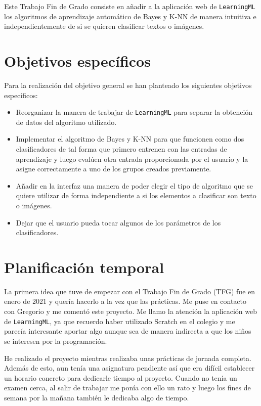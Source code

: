 \documentclass[a4paper, 12pt]{book}
\begin{document}
Este Trabajo Fin de Grado consiste en añadir a la aplicación web de \texttt{LearningML} los algoritmos de aprendizaje automático de Bayes y K-NN de manera intuitiva e independientemente de si se quieren clasificar textos o imágenes.

\section{Objetivos específicos}
\label{sec:objetivos-especificos}

Para la realización del objetivo general se han planteado los siguientes objetivos específicos:
\begin{itemize}
 
	\item Reorganizar la manera de trabajar de \texttt{LearningML} para separar la obtención de datos del algoritmo utilizado.
 
	\item Implementar el algoritmo de Bayes y K-NN para que funcionen como dos clasificadores de tal forma que primero entrenen con las entradas de aprendizaje y luego evalúen otra entrada proporcionada por el usuario y la asigne correctamente a uno de los grupos creados previamente.
 
	\item Añadir en la interfaz una manera de poder elegir el tipo de algoritmo que se quiere utilizar de forma independiente a si los elementos a clasificar son texto o imágenes.

	\item Dejar que el usuario pueda tocar algunos de los parámetros de los clasificadores.

\end{itemize}


\section{Planificación temporal}
\label{sec:planificacion-temporal}

La primera idea que tuve de empezar con el Trabajo Fin de Grado (TFG) fue en enero de 2021 y quería hacerlo a la vez que las prácticas. Me puse en contacto con Gregorio y me comentó este proyecto. Me llamo la atención la aplicación web de \texttt{LearningML}, ya que recuerdo haber utilizado Scratch en el colegio y me parecía interesante aportar algo aunque sea de manera indirecta a que los niños se interesen por la programación.

He realizado el proyecto mientras realizaba unas prácticas de jornada completa. Además de esto, aun tenía una asignatura pendiente así que era difícil establecer un horario concreto para dedicarle tiempo al proyecto. Cuando no tenía un examen cerca, al salir de trabajar me ponía con ello un rato y luego los fines de semana por la mañana también le dedicaba algo de tiempo.
\end{document}
